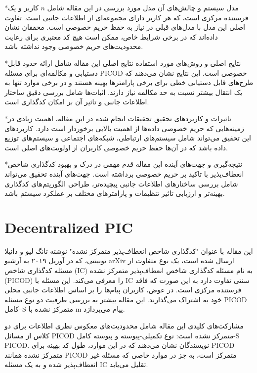 \textbf{}*{مدل سیستم و چالش‌های آن}
مدل مورد بررسی در این مقاله شامل $n$ کاربر و یک فرستنده مرکزی است، که هر کاربر دارای مجموعه‌ای از اطلاعات جانبی است. تفاوت اصلی این مدل با مدل‌های قبلی در نیاز به حفظ حریم خصوصی است. محققان نشان داده‌اند که در برخی شرایط خاص، ممکن است هیچ کد معتبری برای رعایت محدودیت‌های حریم خصوصی وجود نداشته باشد.

\textbf{}*{نتایج اصلی و روش‌های مورد استفاده}
نتایج اصلی این مقاله شامل ارائه حدود قابل دستیابی و مکالمه‌ای برای مسئله PICOD خصوصی است. این نتایج نشان می‌دهند که طرح‌های قابل دستیابی خطی برای برخی پارامترها بهینه هستند و در برخی موارد تنها به یک انتقال بیشتر نسبت به حد مکالمه نیاز دارند. اثبات‌ها شامل بررسی دقیق ساختار اطلاعات جانبی و تاثیر آن بر امکان کدگذاری است.

\textbf{}*{تاثیرات و کاربردهای تحقیق}
تحقیقات انجام شده در این مقاله، اهمیت زیادی در زمینه‌هایی که حریم خصوصی داده‌ها از اهمیت بالایی برخوردار است دارد. کاربردهای این تحقیق می‌تواند شامل سیستم‌های ارتباطی، شبکه‌های اجتماعی و سیستم‌های توزیع داده باشد که در آن‌ها حفظ حریم خصوصی کاربران از اولویت‌های اصلی است.

\textbf{}*{نتیجه‌گیری و جهت‌های آینده}
این مقاله قدم مهمی در درک و بهبود کدگذاری شاخص انعطاف‌پذیر با تاکید بر حریم خصوصی برداشته است. جهت‌های آینده تحقیق می‌تواند شامل بررسی ساختارهای اطلاعات جانبی پیچیده‌تر، طراحی الگوریتم‌های کدگذاری بهینه‌تر و ارزیابی تاثیر تنظیمات و پارامترهای مختلف بر عملکرد سیستم باشد.



\section*{Decentralized PIC}

این مقاله با عنوان "کدگذاری شاخص انعطاف‌پذیر متمرکز نشده" نوشته تانگ لیو و دانیلا تونینتی، که در آوریل ۲۰۱۹ به آرشیو
arXiv ارسال شده است، یک نوع متفاوت از مسئله کدگذاری شاخص (IC) به نام مسئله کدگذاری شاخص انعطاف‌پذیر متمرکز نشده (PICOD) را معرفی می‌کند.
این مسئله با IC سنتی تفاوت دارد به این صورت که فاقد فرستنده مرکزی است. در عوض، کاربران پیام‌ها را بر اساس اطلاعات جانبی محلی خود به اشتراک می‌گذارند.
این مقاله بیشتر به بررسی ظرفیت دو نوع مسئله PICOD کامل–S متمرکز نشده با m پیام می‌پردازد.

مشارکت‌های کلیدی این مقاله شامل محدودیت‌های معکوس نظری اطلاعات برای دو کلاس از مسائل PICOD متمرکز نشده است: نوع تکمیلی-پیوسته و پیوسته کامل-S PICOD.
نویسندگان نشان می‌دهند که در این موارد، طول کد بهینه برای PICOD متمرکز نشده همانند PICOD متمرکز است، به جز در موارد خاصی که مسئله غیر انعطاف‌پذیر شده و
به یک مسئله IC تقلیل می‌یابد.

